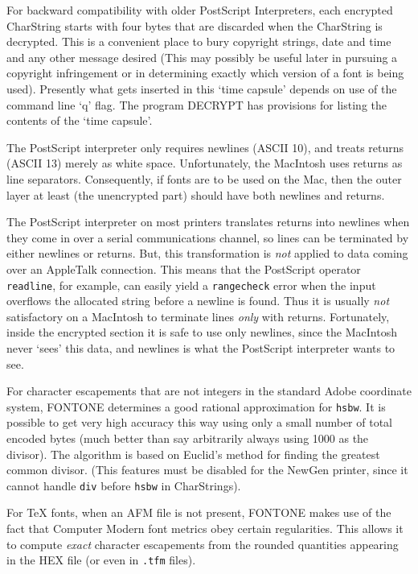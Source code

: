 \bpar For backward compatibility with older PostScript Interpreters,
each encrypted CharString starts with four bytes that are discarded
when the CharString is decrypted.  This is a convenient place to bury
copyright strings, date and time and any other message desired 
(This may possibly be useful later in pursuing a copyright infringement
or in determining exactly which version of a font is being used).  
Presently what gets inserted in this `time capsule' depends on use of
the command line `q' flag.  
The program DECRYPT has provisions for listing the contents
of the `time capsule'.

\bpar The PostScript interpreter only requires newlines (ASCII 10), and
treats returns (ASCII 13) merely as white space.
Unfortunately, the MacIntosh uses returns as line separators.
Consequently, if fonts are to be used on the Mac, then the outer layer
at least (the unencrypted part) should have both newlines and returns.

\bpar The PostScript interpreter on most printers translates returns
into newlines when they come in over a serial communications channel,
so lines can be terminated by either newlines or returns.  
But, this transformation is {\it not} applied to data coming over an
AppleTalk connection.
This means that the PostScript operator {\tt readline}, for example,
can easily yield a {\tt rangecheck} error when the input overflows the
allocated string before a newline is found.  
Thus it is usually {\it not} satisfactory on a MacIntosh to terminate lines
{\it only} with returns.
Fortunately, inside the encrypted section it is safe to use only
newlines, since the MacIntosh never `sees' this data, and newlines is
what the PostScript interpreter wants to see.


\bpar For character escapements that are not integers in the standard
Adobe coordinate system, FONTONE determines a good rational
approximation for {\tt hsbw}. 
It is possible to get very high accuracy this way using only a small
number of total encoded bytes (much better than say arbitrarily always
using 1000 as the divisor).
The algorithm is based on Euclid's method for finding the greatest
common divisor.
(This features must be disabled for the NewGen printer, since it cannot
handle {\tt div} before {\tt hsbw} in CharStrings).

\bpar For {\TeX} fonts, when an AFM file is not present, FONTONE makes
use of the fact that Computer Modern font metrics obey certain regularities.
This allows it to compute {\it exact} character escapements from the rounded
quantities appearing in the HEX file (or even in {\tt .tfm} files).


